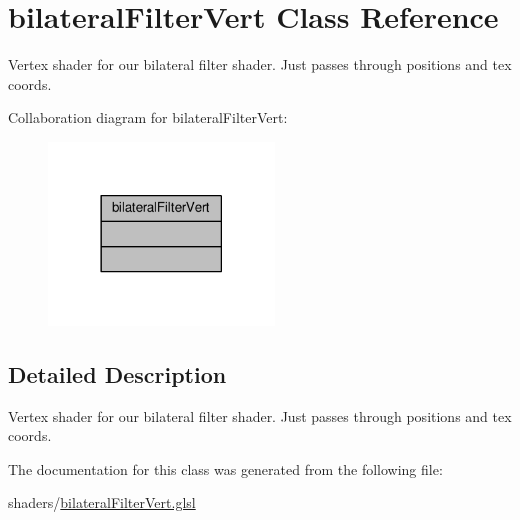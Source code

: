 \hypertarget{classbilateral_filter_vert}{\section{bilateral\-Filter\-Vert Class Reference}
\label{classbilateral_filter_vert}
}


Vertex shader for our bilateral filter shader. Just passes through positions and tex coords.  




Collaboration diagram for bilateral\-Filter\-Vert\-:\nopagebreak
\begin{figure}[H]
\begin{center}
\leavevmode
\includegraphics[width=170pt]{classbilateral_filter_vert__coll__graph}
\end{center}
\end{figure}


\subsection{Detailed Description}
Vertex shader for our bilateral filter shader. Just passes through positions and tex coords. 

The documentation for this class was generated from the following file\-:\begin{DoxyCompactItemize}
\item 
shaders/\hyperlink{bilateral_filter_vert_8glsl}{bilateral\-Filter\-Vert.\-glsl}\end{DoxyCompactItemize}
